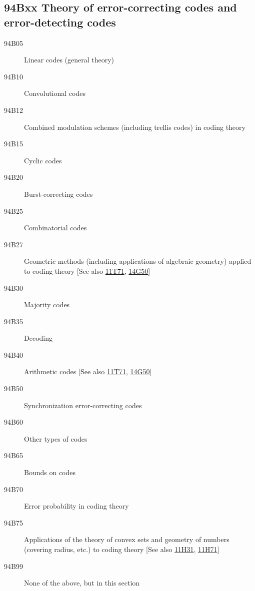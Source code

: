 \documentclass[letterpaper]{article}
\begin{document}
\subsection*{94Bxx  Theory of error-correcting codes and error-detecting codes }\label{94Bxx}
\begin{description}  
\item [94B05]\label{94B05} Linear codes (general theory)
\item [94B10]\label{94B10} Convolutional codes
\item [94B12]\label{94B12} Combined modulation schemes (including trellis codes) in coding theory
\item [94B15]\label{94B15} Cyclic codes
\item [94B20]\label{94B20} Burst-correcting codes
\item [94B25]\label{94B25} Combinatorial codes
\item [94B27]\label{94B27} Geometric methods (including applications of algebraic geometry) applied to coding theory [See also \hyperref[11T71]{11T71}, \hyperref[14G50]{14G50}]
\item [94B30]\label{94B30} Majority codes
\item [94B35]\label{94B35} Decoding
\item [94B40]\label{94B40} Arithmetic codes [See also \hyperref[11T71]{11T71}, \hyperref[14G50]{14G50}]
\item [94B50]\label{94B50} Synchronization error-correcting codes
\item [94B60]\label{94B60} Other types of codes
\item [94B65]\label{94B65} Bounds on codes
\item [94B70]\label{94B70} Error probability in coding theory
\item [94B75]\label{94B75} Applications of the theory of convex sets and geometry of numbers (covering radius, etc.) to coding theory [See also \hyperref[11H31]{11H31}, \hyperref[11H71]{11H71}]
\item [94B99]\label{94B99} None of the above, but in this section
\end{description}
\end{document}
